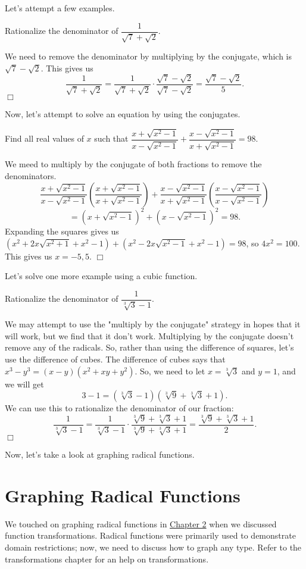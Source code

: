 \documentclass[../book.tex]{subfiles}
\begin{document}
Let's attempt a few examples.
\begin{example}
Rationalize the denominator of $\dfrac{1}{\sqrt{7}+\sqrt{2}}$.
\end{example}
\begin{solution}
We need to remove the denominator by multiplying by the conjugate, which is $\sqrt{7}-\sqrt{2}$. This gives us $$\dfrac{1}{\sqrt{7}+\sqrt{2}}=\dfrac{1}{\sqrt{7}+\sqrt{2}}\cdot\dfrac{\sqrt{7}-\sqrt{2}}{\sqrt{7}-\sqrt{2}}=\dfrac{\sqrt{7}-\sqrt{2}}{5}.$$ $\Box$
\end{solution}
Now, let's attempt to solve an equation by using the conjugates.
\begin{example}
Find all real values of $x$ such that $\dfrac{x+\sqrt{x^2-1}}{x-\sqrt{x^2-1}}+\dfrac{x-\sqrt{x^2-1}}{x+\sqrt{x^2-1}}=98.$
\end{example}
\begin{solution}
We meed to multiply by the conjugate of both fractions to remove the denominators. $$\dfrac{x+\sqrt{x^2-1}}{x-\sqrt{x^2-1}}\left(\dfrac{x+\sqrt{x^2-1}}{x+\sqrt{x^2-1}}\right)+\dfrac{x-\sqrt{x^2-1}}{x+\sqrt{x^2-1}}\left(\dfrac{x-\sqrt{x^2-1}}{x-\sqrt{x^2-1}}\right)$$$$=(x+\sqrt{x^2-1})^2+(x-\sqrt{x^2-1})^2=98.$$
Expanding the squares gives us $(x^2+2x\sqrt{x^2+1}+x^2-1)+(x^2-2x\sqrt{x^2-1}+x^2-1)=98$, so $4x^2=100$. This gives us $x=-5,5$. $\Box$
\end{solution}
Let's solve one more example using a cubic function.
\begin{example}
Rationalize the denominator of $\dfrac{1}{\sqrt[3]{3}-1}$.
\end{example}
\begin{solution}
We may attempt to use the "multiply by the conjugate" strategy in hopes that it will work, but we find that it don't work.  Multiplying by the conjugate doesn't remove any of the radicals.  So, rather than using the difference of squares, let's use the difference of cubes.  The difference of cubes says that $x^3-y^3=(x-y)(x^2+xy+y^2)$.  So, we need to let $x=\sqrt[3]{3}$ and $y=1$, and we will get $$3-1=(\sqrt[3]{3}-1)(\sqrt[3]{9}+\sqrt[3]{3}+1).$$ We can use this to rationalize the denominator of our fraction: $$\dfrac{1}{\sqrt[3]{3}-1}=\dfrac{1}{\sqrt[3]{3}-1}\cdot\dfrac{\sqrt[3]{9}+\sqrt[3]{3}+1}{\sqrt[3]{9}+\sqrt[3]{3}+1}=\dfrac{\sqrt[3]{9}+\sqrt[3]{3}+1}{2}.$$ $\Box$
\end{solution}
\noindent Now, let's take a look at graphing radical functions.
\section{Graphing Radical Functions}
\noindent We touched on graphing radical functions in \hyperlink{chapter.2}{Chapter 2} when we discussed function transformations.  Radical functions were primarily used to demonstrate domain restrictions; now, we need to discuss how to graph any type.  Refer to the transformations chapter for an help on transformations.
\end{document}

